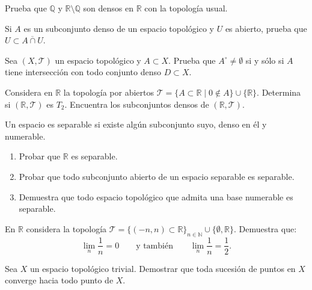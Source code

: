 \begin{ejer}[56]
Prueba que $\mathbb{Q}$ y $\mathbb{R} \setminus \mathbb{Q}$ son densos en $\mathbb{R}$ con la topología usual.
\end{ejer}

\begin{ejer}[57]
Si $A$ es un subconjunto denso de un espacio topológico y $U$ es abierto, prueba que $U \subset \overline{A \cap U}$.
\end{ejer}

\begin{ejer}[58]
Sea $(X, \mathcal{T})$ un espacio topológico y $A \subset X$. Prueba que $A^\circ \neq \emptyset$ si y sólo si $A$ tiene intersección con todo conjunto denso $D \subset X$.
\end{ejer}

\begin{ejer}[59]
Considera en $\mathbb{R}$ la topología por abiertos $\mathcal{T} = \{A \subset \mathbb{R} \mid 0 \notin A\} \cup \{\mathbb{R}\}$. Determina si $(\mathbb{R}, \mathcal{T})$ es $T_2$. Encuentra los subconjuntos densos de $(\mathbb{R}, \mathcal{T})$.
\end{ejer}

\begin{ejer}[60]
Un espacio es separable si existe algún subconjunto suyo, denso en él y numerable.
\begin{enumerate}
    \item[a)] Probar que $\mathbb{R}$ es separable.
    \item[b)] Probar que todo subconjunto abierto de un espacio separable es separable.
    \item[c)] Demuestra que todo espacio topológico que admita una base numerable es separable.
\end{enumerate}
\end{ejer}

\begin{ejer}[61]
En $\mathbb{R}$ considera la topología $\mathcal{T} = \{(-n, n) \subset \mathbb{R}\}_{n \in \mathbb{N}} \cup \{\emptyset, \mathbb{R}\}$. Demuestra que:
\[
    \lim_n \frac{1}{n} = 0 \qquad \text{y también} \qquad \lim_n \frac{1}{n} = \frac{1}{2}.
\]
\end{ejer}

\begin{ejer}[62]
Sea $X$ un espacio topológico trivial. Demostrar que toda sucesión de puntos en $X$ converge hacia todo punto de $X$.
\end{ejer}

